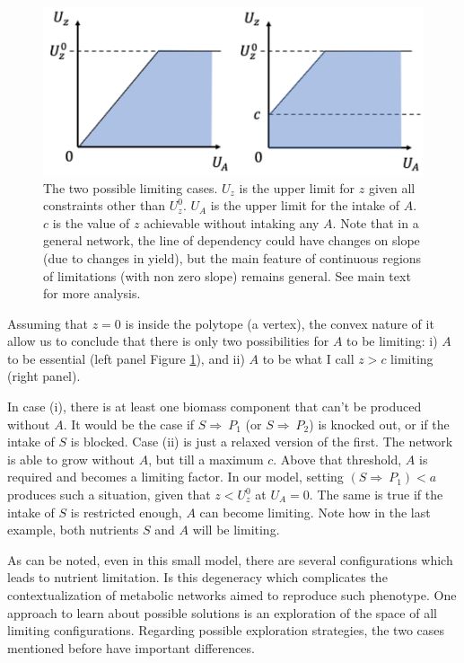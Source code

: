 \documentclass[
10pt, %
a4paper, %
oneside, %
headinclude,footinclude, %
BCOR5mm, %
]{scrartcl}
\begin{document}
\begin{figure}[h]
\centering
\includegraphics[width=0.8\columnwidth]{images/limiting_cases.png}
\caption[]{The two possible limiting cases.
$U_z$ is the upper limit for $z$ given all constraints other than $U_z^0$.
$U_A$ is the upper limit for the intake of $A$.
$c$ is the value of $z$ achievable without intaking any $A$.
Note that in a general network, the line of dependency could have changes on slope (due to changes in yield),
but the main feature of continuous regions of limitations (with non zero slope) remains general.
See main text for more analysis.
}
\label{fig:limiting_cases}
\end{figure}

Assuming that $z=0$ is inside the polytope (a vertex),
the convex nature of it allow us to conclude that there is only two possibilities for
$A$ to be limiting: i) $A$ to be essential (left panel Figure \ref{fig:limiting_cases}),
and ii) $A$ to be what I call $z > c$ limiting (right panel).

In case (i), there is at least one biomass component that can't be produced without $A$.
It would be the case if $S \Rightarrow ~P_1$ (or $S \Rightarrow ~P_2$) is knocked out, or
if the intake of $S$ is blocked.
Case (ii) is just a relaxed version of the first. The network is able to grow without $A$, but till a maximum $c$.
Above that threshold, $A$ is required and becomes a limiting factor.
In our model, setting $(S \Rightarrow ~P_1) < a$ produces such a situation, given that $z < U_z^0$ at $U_A = 0$.
The same is true if the intake of $S$ is restricted enough, $A$ can become limiting.
Note how in the last example, both nutrients $S$ and $A$ will be limiting.

As can be noted, even in this small model, there are several configurations which leads to nutrient limitation.
Is this degeneracy which complicates the contextualization of metabolic networks aimed to reproduce such phenotype.
One approach to learn about possible solutions is an exploration of the space of all limiting configurations.
Regarding possible exploration strategies, the two cases mentioned before have important differences.
\end{document}
